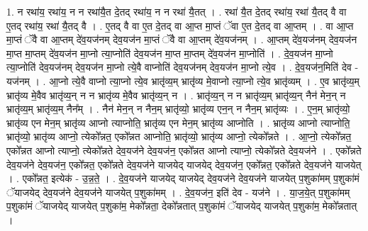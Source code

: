 \documentclass[17pt]{extarticle}
\begin{document}
1. न रथा॑य॒ रथा॑य॒ न न रथा॑यै॒त दे॒तद् रथा॑य॒ न न रथा॑ यै॒तत् । . रथा॑ यै॒त दे॒तद् रथा॑य॒ रथा॑ यै॒तद् वै वा ए॒तद् रथा॑य॒ रथा॑ यै॒तद् वै । . ए॒तद् वै वा ए॒त दे॒तद् वा आ॒प्त मा॒प्तं ॅवा ए॒त दे॒तद् वा आ॒प्तम् । . वा आ॒प्त मा॒प्तं ॅवै वा आ॒प्तम् दे॑व॒यज॑नम् देव॒यज॑न मा॒प्तं ॅवै वा आ॒प्तम् दे॑व॒यज॑नम् । . आ॒प्तम् दे॑व॒यज॑नम् देव॒यज॑न मा॒प्त मा॒प्तम् दे॑व॒यज॑न मा॒प्नो त्या॒प्नोति॑ देव॒यज॑न मा॒प्त मा॒प्तम् दे॑व॒यज॑न मा॒प्नोति॑ । . दे॒व॒यज॑न मा॒प्नो त्या॒प्नोति॑ देव॒यज॑नम् देव॒यज॑न मा॒प्नो त्ये॒वै वाप्नोति॑ देव॒यज॑नम् देव॒यज॑न मा॒प्नो त्ये॒व । . दे॒व॒यज॑न॒मिति॑ देव - यज॑नम् । . आ॒प्नो त्ये॒वै वाप्नो त्या॒प्नो त्ये॒व भ्रातृ॑व्य॒म् भ्रातृ॑व्य मे॒वाप्नो त्या॒प्नो त्ये॒व भ्रातृ॑व्यम् । . ए॒व भ्रातृ॑व्य॒म् भ्रातृ॑व्य मे॒वैव भ्रातृ॑व्य॒न् न न भ्रातृ॑व्य मे॒वैव भ्रातृ॑व्य॒न् न । . भ्रातृ॑व्य॒न् न न भ्रातृ॑व्य॒म् भ्रातृ॑व्य॒न् नैन॑ मेन॒न् न भ्रातृ॑व्य॒म् भ्रातृ॑व्य॒म् नैन᳚म् । . नैन॑ मेन॒न् न नैन॒म् भ्रातृ॑व्यो॒ भ्रातृ॑व्य एन॒न् न नैन॒म् भ्रातृ॑व्यः । . ए॒न॒म् भ्रातृ॑व्यो॒ भ्रातृ॑व्य एन मेन॒म् भ्रातृ॑व्य आप्नो त्याप्नोति॒ भ्रातृ॑व्य एन मेन॒म् भ्रातृ॑व्य आप्नोति । . भ्रातृ॑व्य आप्नो त्याप्नोति॒ भ्रातृ॑व्यो॒ भ्रातृ॑व्य आप्नो॒ त्येको᳚न्नत॒ एको᳚न्नत आप्नोति॒ भ्रातृ॑व्यो॒ भ्रातृ॑व्य आप्नो॒ त्येको᳚न्नते । . आ॒प्नो॒ त्येको᳚न्नत॒ एको᳚न्नत आप्नो त्याप्नो॒ त्येको᳚न्नते देव॒यज॑ने देव॒यज॑न॒ एको᳚न्नत आप्नो त्याप्नो॒ त्येको᳚न्नते देव॒यज॑ने । . एको᳚न्नते देव॒यज॑ने देव॒यज॑न॒ एको᳚न्नत॒ एको᳚न्नते देव॒यज॑ने याजयेद् याजयेद् देव॒यज॑न॒ एको᳚न्नत॒ एको᳚न्नते देव॒यज॑ने याजयेत् । . एको᳚न्नत॒ इत्येक॑ - उ॒न्न॒ते॒ । . दे॒व॒यज॑ने याजयेद् याजयेद् देव॒यज॑ने देव॒यज॑ने याजयेत् प॒शुका॑मम् प॒शुका॑मं ॅयाजयेद् देव॒यज॑ने देव॒यज॑ने याजयेत् प॒शुका॑मम् । . दे॒व॒यज॑न॒ इति॑ देव - यज॑ने । . या॒ज॒ये॒त् प॒शुका॑मम् प॒शुका॑मं ॅयाजयेद् याजयेत् प॒शुका॑म॒ मेको᳚न्नता॒ देको᳚न्नतात् प॒शुका॑मं ॅयाजयेद् याजयेत् प॒शुका॑म॒ मेको᳚न्नतात् । \newline
\end{document}
